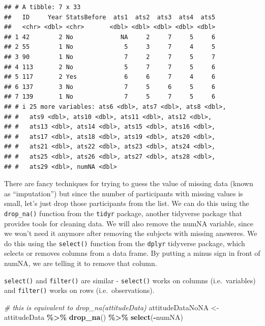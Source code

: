 \documentclass[
  12pt,
]{book}
\newenvironment{Shaded}{\begin{snugshade}}{\end{snugshade}}
\newcommand{\CommentTok}[1]{\textcolor[rgb]{0.56,0.35,0.01}{\textit{#1}}}
\newcommand{\FunctionTok}[1]{\textcolor[rgb]{0.13,0.29,0.53}{\textbf{#1}}}
\newcommand{\NormalTok}[1]{#1}
\newcommand{\OtherTok}[1]{\textcolor[rgb]{0.56,0.35,0.01}{#1}}
\newcommand{\SpecialCharTok}[1]{\textcolor[rgb]{0.81,0.36,0.00}{\textbf{#1}}}
\begin{document}
\begin{verbatim}
## # A tibble: 7 x 33
##   ID     Year StatsBefore  ats1  ats2  ats3  ats4  ats5
##   <chr> <dbl> <chr>       <dbl> <dbl> <dbl> <dbl> <dbl>
## 1 42        2 No             NA     2     7     5     6
## 2 55        1 No              5     3     7     4     5
## 3 90        1 No              7     2     7     5     7
## 4 113       2 No              5     7     7     5     6
## 5 117       2 Yes             6     6     7     4     6
## 6 137       3 No              7     5     6     5     6
## 7 139       1 No              7     5     7     5     6
## # i 25 more variables: ats6 <dbl>, ats7 <dbl>, ats8 <dbl>,
## #   ats9 <dbl>, ats10 <dbl>, ats11 <dbl>, ats12 <dbl>,
## #   ats13 <dbl>, ats14 <dbl>, ats15 <dbl>, ats16 <dbl>,
## #   ats17 <dbl>, ats18 <dbl>, ats19 <dbl>, ats20 <dbl>,
## #   ats21 <dbl>, ats22 <dbl>, ats23 <dbl>, ats24 <dbl>,
## #   ats25 <dbl>, ats26 <dbl>, ats27 <dbl>, ats28 <dbl>,
## #   ats29 <dbl>, numNA <dbl>
\end{verbatim}

There are fancy techniques for trying to guess the value of missing data (known as ``imputation'') but since the number of participants with missing values is small, let's just drop those participants from the list. We can do this using the \texttt{drop\_na()} function from the \texttt{tidyr} package, another tidyverse package that provides tools for cleaning data. We will also remove the numNA variable, since we won't need it anymore after removing the subjects with missing answeres. We do this using the \texttt{select()} function from the \texttt{dplyr} tidyverse package, which selects or removes columns from a data frame. By putting a minus sign in front of numNA, we are telling it to remove that column.

\texttt{select()} and \texttt{filter()} are similar - \texttt{select()} works on columns (i.e.~variables) and \texttt{filter()} works on rows (i.e.~observations).

\begin{Shaded}
\begin{Highlighting}[]
\CommentTok{\# this is equivalent to drop\_na(attitudeData)}
\NormalTok{attitudeDataNoNA }\OtherTok{\textless{}{-}} 
\NormalTok{  attitudeData }\SpecialCharTok{\%\textgreater{}\%} 
  \FunctionTok{drop\_na}\NormalTok{() }\SpecialCharTok{\%\textgreater{}\%} 
  \FunctionTok{select}\NormalTok{(}\SpecialCharTok{{-}}\NormalTok{numNA)}
\end{Highlighting}
\end{Shaded}
\end{document}
